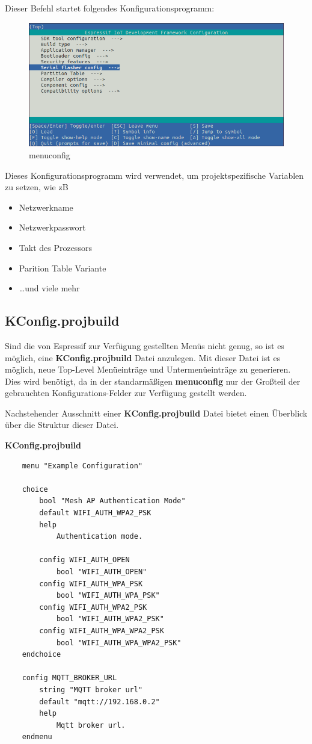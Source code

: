 Dieser Befehl startet folgendes Konfigurationsprogramm:
\begin{figure}[H]
    \begin{center}
        \includegraphics[scale=0.5]{images/menuconfig.png}
        \caption{menuconfig \cite{menuconfig_picture}}
    \end{center}
\end{figure}
Dieses Konfigurationsprogramm wird verwendet, um projektspezifische Variablen zu setzen, wie zB
\begin{itemize}
    \item Netzwerkname
    \item Netzwerkpasswort
    \item Takt des Prozessors
    \item Parition Table Variante
    \item \dots und viele mehr
\end{itemize}

\subsection{KConfig.projbuild}\label{sec:esp-idf-projbuild}
Sind die von Espressif zur Verfügung gestellten Menüs nicht genug, so ist es möglich, eine \textbf{KConfig.projbuild} Datei anzulegen. Mit dieser Datei ist es möglich, neue Top-Level Menüeinträge und Untermenüeinträge zu generieren. Dies wird benötigt, da in der standarmäßigen \textbf{menuconfig} nur der Großteil der gebrauchten Konfigurations-Felder zur Verfügung gestellt werden. 

Nachstehender Ausschnitt einer \textbf{KConfig.projbuild} Datei bietet einen Überblick über die Struktur dieser Datei.

\pagebreak
\textbf{KConfig.projbuild}
\begin{verbatim}
    menu "Example Configuration"

    choice
        bool "Mesh AP Authentication Mode"
        default WIFI_AUTH_WPA2_PSK
        help
            Authentication mode.

        config WIFI_AUTH_OPEN
            bool "WIFI_AUTH_OPEN"
        config WIFI_AUTH_WPA_PSK
            bool "WIFI_AUTH_WPA_PSK"
        config WIFI_AUTH_WPA2_PSK
            bool "WIFI_AUTH_WPA2_PSK"
        config WIFI_AUTH_WPA_WPA2_PSK
            bool "WIFI_AUTH_WPA_WPA2_PSK"
    endchoice

    config MQTT_BROKER_URL
        string "MQTT broker url"
        default "mqtt://192.168.0.2"
        help
            Mqtt broker url.
    endmenu
\end{verbatim}

